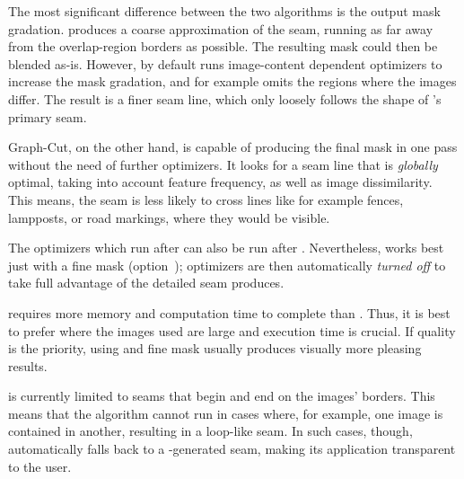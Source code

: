 %
The most significant difference between the two algorithms is the output mask gradation.
 produces a coarse approximation of the seam, running as far away from the
overlap-region borders as possible.  The resulting mask could then be blended as-is.  However,
\App{} by default runs image-content dependent optimizers to increase the mask gradation, and
for example omits the regions where the images differ.  The result is a finer seam line, which
only loosely follows the shape of 's primary seam.

%
Graph-Cut, on the other hand, is capable of producing the final mask in one pass without the
need of further optimizers.  It looks for a seam line that is \emph{globally} optimal, taking
into account feature frequency, as well as image dissimilarity.  This means, the seam is less
likely to cross lines like for example fences, lampposts, or road markings, where they would be
visible.

The optimizers which run after  can also be run after .  Nevertheless,
 works best just with a fine mask (option~); optimizers are then
automatically \emph{turned off} to take full advantage of the detailed seam 
produces.

 requires more memory and computation time to complete than .  Thus, it
is best to prefer  where the images used are large and execution time is crucial.
If quality is the priority, using  and fine mask usually produces visually more
pleasing results.

%
 is currently limited to seams that begin and end on the images' borders.  This
means that the algorithm cannot run in cases where, for example, one image is contained in
another, resulting in a loop-like seam.  In such cases, though, \App{} automatically falls back
to a -generated seam, making its application transparent to the user.




